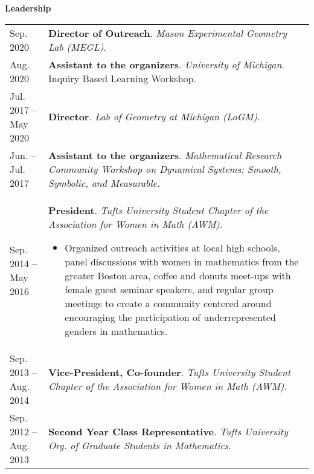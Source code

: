 
    \medskip


    \medskip
    \medskip



    \textbf{\large Leadership}
    
    \begin{center}
    {
    \renewcommand{\arraystretch}{1.2}
    \begin{longtable}{p{}  p{}}
     Sep.  2020 & \textbf{Director of Outreach}. \textit{Mason Experimental Geometry Lab (MEGL)}.  \\ 
 Aug.  2020 & \textbf{Assistant to the organizers}. \textit{University of Michigan}.  Inquiry Based Learning Workshop.  \\ 
 Jul.  2017 --  May  2020 & \textbf{Director}. \textit{Lab of Geometry at Michigan (LoGM)}.  \\ 
 Jun.  --  Jul.  2017 & \textbf{Assistant to the organizers}. \textit{Mathematical Research Community Workshop on Dynamical Systems: Smooth, Symbolic, and Measurable}.  \\ 
 Sep.  2014 --  May  2016 & \textbf{President}. \textit{Tufts University Student Chapter of the Association for Women in Math (AWM)}. 
        \hspace{-1em}

        {\small
        \begin{itemize}
        \setlength{\parindent}{0em}
        \item[] Organized outreach activities at local high schools, panel discussions with women in mathematics from the greater Boston area, coffee and donuts meet-ups with female guest seminar speakers, and regular group meetings to create a community centered around encouraging the participation of underrepresented genders in mathematics.
        \end{itemize}
        }
        \vspace{-1em}
         \\ 
 Sep.  2013 --  Aug.  2014 & \textbf{Vice-President, Co-founder}. \textit{Tufts University Student Chapter of the Association for Women in Math (AWM)}.  \\ 
 Sep.  2012 --  Aug.  2013 & \textbf{Second Year Class Representative}. \textit{Tufts University Org. of Graduate Students in Mathematics}.  
    \end{longtable}
    } 
    \end{center}

